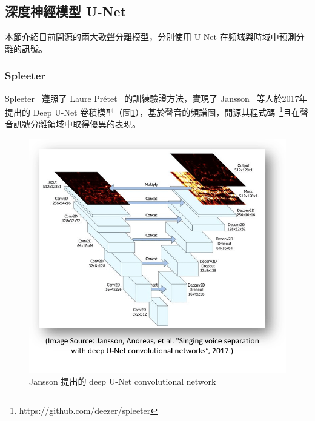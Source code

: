 \subsection{深度神經模型 U-Net}
本節介紹目前開源的兩大歌聲分離模型，分別使用 U-Net 在頻域與時域中預測分離的訊號。

\subsubsection{Spleeter}
Spleeter~\cite{hennequin2020spleeter} 遵照了 Laure Prétet ~\cite{pretet2019singing}的訓練驗證方法，實現了 Jansson~\cite{jansson2017singing} 等人於2017年提出的 Deep U-Net 卷積模型（圖\ref{spleeter1}），基於聲音的頻譜圖，開源其程式碼~\footnote{https://github.com/deezer/spleeter}且在聲音訊號分離領域中取得優異的表現。

\begin{figure}[htbp]
    \hfil
    \begin{minipage}[t]{0.55\textwidth}
        \includegraphics[width=\textwidth]{./figures/chapter02_method/spleeter1.png}
        \caption {Jansson 提出的 deep U-Net convolutional network}
        \label{spleeter1}
    \end{minipage}
    \hfil
\end{figure}

